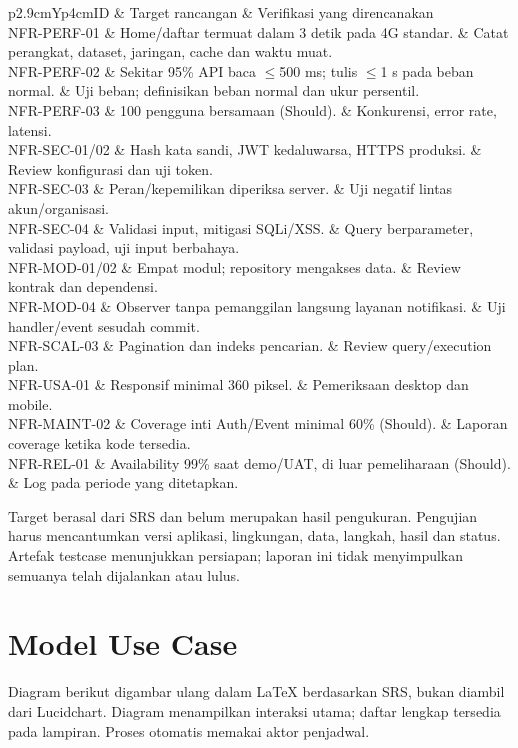 \documentclass[11pt,a4paper]{article}
\newcommand{\tbl}[2]{\par\smallskip\noindent\begin{tabularx}{\linewidth}{#1}\toprule #2\bottomrule\end{tabularx}\par\smallskip}
\newcommand{\page}[1]{\clearpage\section{#1}}
\begin{document}
\tbl{p{2.9cm}Yp{4cm}}{ID & Target rancangan & Verifikasi yang direncanakan\\\midrule
NFR-PERF-01 & Home/daftar termuat dalam 3 detik pada 4G standar. & Catat perangkat, dataset, jaringan, cache dan waktu muat.\\
NFR-PERF-02 & Sekitar 95\% API baca $\leq$500 ms; tulis $\leq$1 s pada beban normal. & Uji beban; definisikan beban normal dan ukur persentil.\\
NFR-PERF-03 & 100 pengguna bersamaan (Should). & Konkurensi, error rate, latensi.\\
NFR-SEC-01/02 & Hash kata sandi, JWT kedaluwarsa, HTTPS produksi. & Review konfigurasi dan uji token.\\
NFR-SEC-03 & Peran/kepemilikan diperiksa server. & Uji negatif lintas akun/organisasi.\\
NFR-SEC-04 & Validasi input, mitigasi SQLi/XSS. & Query berparameter, validasi payload, uji input berbahaya.\\
NFR-MOD-01/02 & Empat modul; repository mengakses data. & Review kontrak dan dependensi.\\
NFR-MOD-04 & Observer tanpa pemanggilan langsung layanan notifikasi. & Uji handler/event sesudah commit.\\
NFR-SCAL-03 & Pagination dan indeks pencarian. & Review query/execution plan.\\
NFR-USA-01 & Responsif minimal 360 piksel. & Pemeriksaan desktop dan mobile.\\
NFR-MAINT-02 & Coverage inti Auth/Event minimal 60\% (Should). & Laporan coverage ketika kode tersedia.\\
NFR-REL-01 & Availability 99\% saat demo/UAT, di luar pemeliharaan (Should). & Log pada periode yang ditetapkan.\\}
Target berasal dari SRS dan belum merupakan hasil pengukuran. Pengujian harus mencantumkan versi aplikasi, lingkungan, data, langkah, hasil dan status. Artefak testcase menunjukkan persiapan; laporan ini tidak menyimpulkan semuanya telah dijalankan atau lulus.
\page{Model Use Case}
Diagram berikut digambar ulang dalam LaTeX berdasarkan SRS, bukan diambil dari Lucidchart. Diagram menampilkan interaksi utama; daftar lengkap tersedia pada lampiran. Proses otomatis memakai aktor penjadwal.
\end{document}
